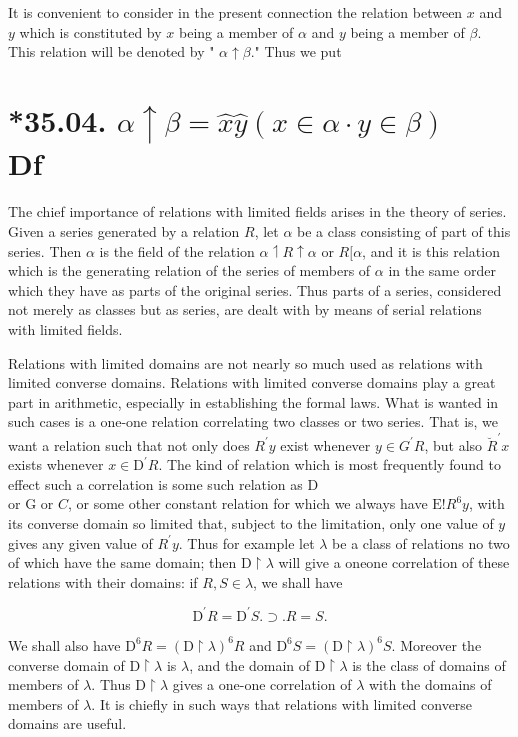 \documentclass[10pt]{article}
\begin{document}
It is convenient to consider in the present connection the relation between $x$ and $y$ which is constituted by $x$ being a member of $\alpha$ and $y$ being a member of $\beta$. This relation will be denoted by " $\alpha \uparrow \beta$." Thus we put

\section*{*35.04. $\alpha \uparrow \beta=\hat{x} \hat{y}(x \in \alpha \cdot y \in \beta) \quad$ Df}
The chief importance of relations with limited fields arises in the theory of series. Given a series generated by a relation $R$, let $\alpha$ be a class consisting of part of this series. Then $\alpha$ is the field of the relation $\alpha \upharpoonleft R \uparrow \alpha$ or $R[\alpha$, and it is this relation which is the generating relation of the series of members of $\alpha$ in the same order which they have as parts of the original series. Thus parts of a series, considered not merely as classes but as series, are dealt with by means of serial relations with limited fields.

Relations with limited domains are not nearly so much used as relations with limited converse domains. Relations with limited converse domains play a great part in arithmetic, especially in establishing the formal laws. What is wanted in such cases is a one-one relation correlating two classes or two series. That is, we want a relation such that not only does $R^{\prime} y$ exist whenever $y \in G^{\prime} R$, but also $\breve{R}^{\prime} x$ exists whenever $x \in \mathrm{D}^{\prime} R$. The kind of relation which is most frequently found to effect such a correlation is some such relation as D\\
or G or $C$, or some other constant relation for which we always have $\mathrm{E}!R^{6} y$, with its converse domain so limited that, subject to the limitation, only one value of $y$ gives any given value of $R^{\prime} y$. Thus for example let $\lambda$ be a class of relations no two of which have the same domain; then $\mathrm{D} \upharpoonright \lambda$ will give a oneone correlation of these relations with their domains: if $R, S \in \lambda$, we shall have

$$
\mathrm{D}^{\prime} R=\mathrm{D}^{\prime} S . \supset . R=S .
$$

We shall also have $\mathrm{D}^{6} R=(\mathrm{D} \upharpoonright \lambda)^{6} R$ and $\mathrm{D}^{6} S=(\mathrm{D} \upharpoonright \lambda)^{6} S$. Moreover the converse domain of $\mathrm{D} \upharpoonright \lambda$ is $\lambda$, and the domain of $\mathrm{D} \upharpoonright \lambda$ is the class of domains of members of $\lambda$. Thus $\mathrm{D} \upharpoonright \lambda$ gives a one-one correlation of $\lambda$ with the domains of members of $\lambda$. It is chiefly in such ways that relations with limited converse domains are useful.
\end{document}
